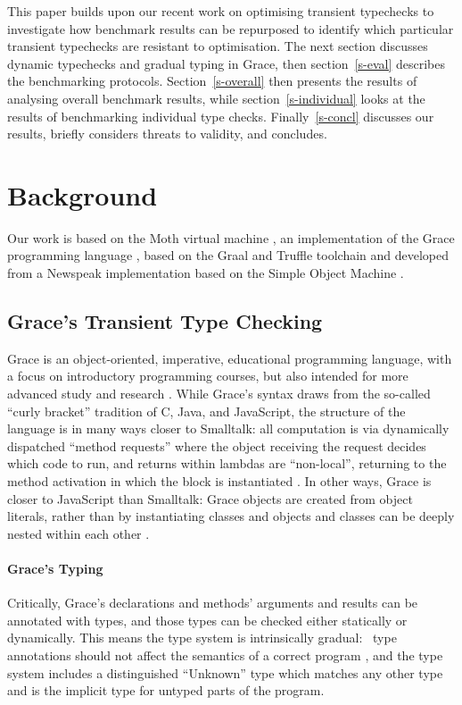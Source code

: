 \documentclass[sigplan,10pt,review,screen]{acmart}\settopmatter{printfolios=true}
\begin{document}
This paper builds upon our recent work on optimising transient
typechecks \cite{Roberts2017,roberts-and-co-ecoop-2019} to
investigate how benchmark results can be repurposed to identify which
particular transient typechecks are resistant to optimisation.
The next section discusses dynamic typechecks and gradual typing in
Grace, then section~\ref{s-eval} describes the benchmarking
protocols. Section~\ref{s-overall} then presents the results of
analysing overall benchmark results, while section~\ref{s-individual}
looks at the results of benchmarking individual type checks.
Finally~\ref{s-concl} discusses our results, briefly considers threats
to validity, and concludes.

\section{Background}
\label{s-bg}

Our work is based on the Moth virtual machine 
\cite{Roberts2017,roberts-and-co-ecoop-2019},
an implementation
of the Grace programming language 
\citep{graceOnward12,graceSigcse13},
based on the Graal and Truffle toolchain
\cite{Wurthinger:2017:PPE,Wurthinger2013}
and developed from a Newspeak implementation based on the  Simple
Object Machine \cite{Daloze2016,SOMns}.

\subsection{Grace's Transient Type Checking}

Grace is an object-oriented, imperative, educational programming
language, with a focus on introductory programming
courses, but also intended for more advanced study and research \citep{graceOnward12,graceSigcse13}.
%
While Grace's syntax draws
from the so-called ``curly bracket'' tradition of C, Java, and
JavaScript, the structure of the language
is in many ways closer to Smalltalk:
all computation is via dynamically dispatched  ``method requests''
where the object receiving the request decides which code to run,
and
%
returns within lambdas are ``non-local'', returning to the method
activation in which the block is instantiated \citep{bluebook}.  In
other ways, Grace is closer to JavaScript than Smalltalk: Grace
objects are created from object literals, rather than by
instantiating classes \citep{Black2007-emeraldHOPL,JonesECOOP2016} and
objects and classes can be deeply nested within each 
other \citep{betabook}.

\paragraph{Grace's Typing}
Critically, Grace's declarations and methods' arguments
and results can be annotated with types, and those types can be  checked
either statically or dynamically. This means the type system is
intrinsically gradual:%
%
~type annotations should not affect the semantics of a correct
program \citep{XXXSiek2015}, and the type system
includes a distinguished ``{Unknown}'' type which matches any other type
and is the implicit type for untyped parts of the program.
\end{document}
